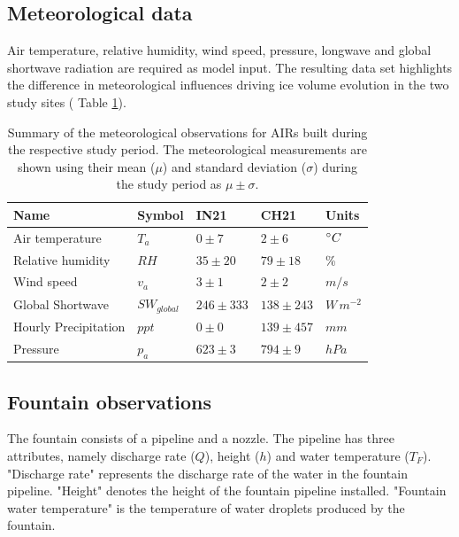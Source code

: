 \subsection{Meteorological data}

Air temperature, relative humidity, wind speed, pressure, longwave and global shortwave radiation are required
as model input.  The resulting data set highlights the difference in meteorological influences driving ice
volume evolution in the two study sites ( Table \ref{tab:Observations}).


\begin{table}
	\centering
	\caption{Summary of the meteorological observations for \ac{AIRs} built during the respective study period.
		The meteorological measurements are shown using their mean ($\mu$) and standard deviation ($\sigma$) during the study
		period as $\mu \pm \sigma$. }

	\label{tab:Observations}
	\begin{tabular}{|lllll|}
		\hline
		\textbf{Name}        & \textbf{Symbol} & \textbf{IN21} & \textbf{CH21} & \textbf{Units} \\ \hline
		Air temperature      & $T_a    $       & $0 \pm 7$     & $2 \pm 6$     & $^{\circ} C$    \\
		Relative humidity    & $RH     $       & $35 \pm 20$   & $79 \pm 18$   & \%             \\
		Wind speed           & $v_a        $   & $3 \pm 1$     & $2 \pm 2$     & $m/s$          \\
		Global Shortwave     & $SW_{global} $  & $246 \pm 333$ & $138 \pm 243$  & $W\,m^{-2}$    \\
		Hourly Precipitation & $ppt        $   & $0 \pm 0$     & $139 \pm 457$ & $mm$           \\
		Pressure             & $p_a         $  & $623 \pm 3$   & $794 \pm 9$   & $hPa$          \\\hline
	\end{tabular}
\end{table}

\subsection{Fountain observations}

The fountain consists of a pipeline and a nozzle. The pipeline has three attributes, namely discharge rate
($Q$), height ($h$) and water temperature ($T_F$). "Discharge rate" represents the discharge rate of the water in
the fountain pipeline. "Height" denotes the height of the fountain pipeline installed. "Fountain water temperature"
is the temperature of water droplets produced by the fountain.

